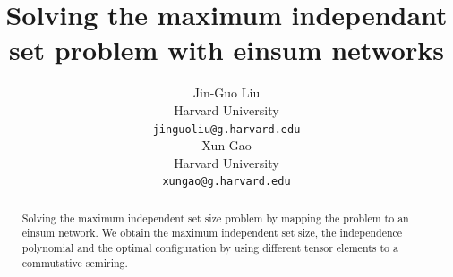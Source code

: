 \documentclass{article}
\newcommand{\<}{\langle}
\renewcommand{\>}{\rangle}
\theoremstyle{definition}\newtheorem{definition}{\textit{Definition}}
\begin{document}
\title{Solving the maximum independant set problem with einsum networks}

\author{Jin-Guo Liu\\
Harvard University\\
\texttt{jinguoliu@g.harvard.edu}\\
\AND
Xun Gao\\
Harvard University\\
\texttt{xungao@g.harvard.edu}\\
}
\maketitle

\begin{abstract}
	Solving the maximum independent set size problem by mapping the problem to an einsum network. 
    We obtain the maximum independent set size,
    the independence polynomial and the optimal configuration by using different tensor elements to a commutative semiring.
\end{abstract}
\end{document}
